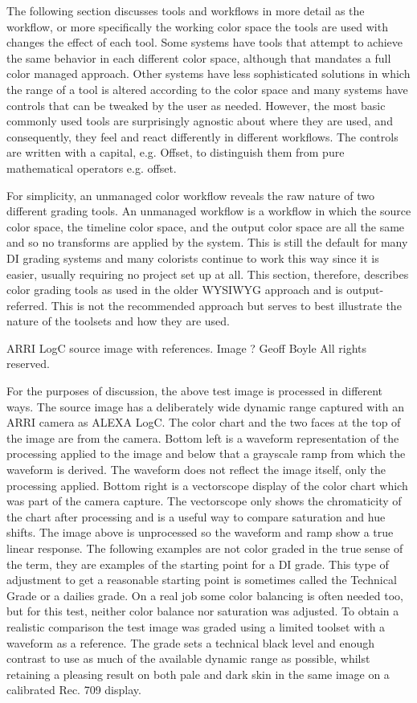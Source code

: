 The following section discusses tools and workflows in more detail as the workflow, or more specifically the working color space the tools are used with changes the effect of each tool. Some systems have tools that attempt to achieve the same behavior in each different color space, although that mandates a full color managed approach. Other systems have less sophisticated solutions in which the range of a tool is altered according to the color space and many systems have controls that can be tweaked by the user as needed. However, the most basic commonly used tools are surprisingly agnostic about where they are used, and consequently, they feel and react differently in different workflows. The controls are written with a capital, e.g. Offset, to distinguish them from pure mathematical operators e.g. offset.

For simplicity, an unmanaged color workflow reveals the raw nature of two different grading tools. An unmanaged workflow is a workflow in which the source color space, the timeline color space, and the output color space are all the same and so no transforms are applied by the system. This is still the default for many DI grading systems and many colorists continue to work this way since it is easier, usually requiring no project set up at all. This section, therefore, describes color grading tools as used in the older WYSIWYG approach and is output-referred. This is not the recommended approach but serves to best illustrate the nature of the toolsets and how they are used.


ARRI LogC source image with references. Image ? Geoff Boyle All rights reserved.


For the purposes of discussion, the above test image is processed in different ways. The source image has a deliberately wide dynamic range captured with an ARRI camera as ALEXA LogC. The color chart and the two faces at the top of the image are from the camera. Bottom left is a waveform representation of the processing applied to the image and below that a grayscale ramp from which the waveform is derived. The waveform does not reflect the image itself, only the processing applied. Bottom right is a vectorscope display of the color chart which was part of the camera capture. The vectorscope only shows the chromaticity of the chart after processing and is a useful way to compare saturation and hue shifts. The image above is unprocessed so the waveform and ramp show a true linear response. The following examples are not color graded in the true sense of the term, they are examples of the starting point for a DI grade. This type of adjustment to get a reasonable starting point is sometimes called the Technical Grade or a dailies grade. On a real job some color balancing is often needed too, but for this test, neither color balance nor saturation was adjusted. To obtain a realistic comparison the test image was graded using a limited toolset with a waveform as a reference. The grade sets a technical black level and enough contrast to use as much of the available dynamic range as possible, whilst retaining a pleasing result on both pale and dark skin in the same image on a calibrated Rec. 709 display.

